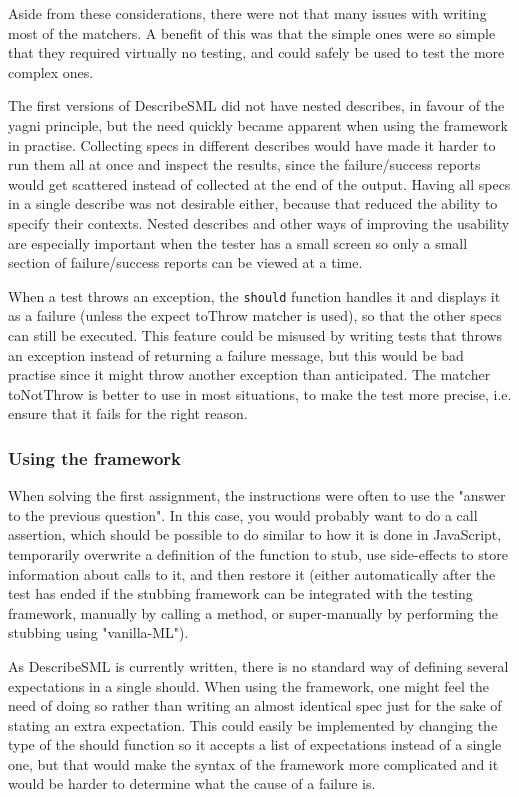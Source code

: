 \documentclass[11pt]{article}
\begin{document}
Aside from these considerations, there were not that many issues with writing most of the matchers. A benefit of this was that the simple ones were so simple that they required virtually no testing, and could safely be used to test the more complex ones.

The first versions of DescribeSML did not have nested describes, in favour of the \gls{yagni} principle, but the need quickly became apparent when using the framework in practise. Collecting specs in different describes would have made it harder to run them all at once and inspect the results, since the failure/success reports would get scattered instead of collected at the end of the output. Having all specs in a single describe was not desirable either, because that reduced the ability to specify their contexts. Nested describes and other ways of improving the usability are especially important when the tester has a small screen so only a small section of failure/success reports can be viewed at a time.

When a test throws an exception, the \texttt{should} function handles it and displays it as a failure (unless the expect toThrow matcher is used), so that the other specs can still be executed. This feature could be misused by writing tests that throws an exception instead of returning a failure message, but this would be bad practise since it might throw another exception than anticipated. The matcher toNotThrow is better to use in most situations, to make the test more precise, i.e. ensure that it fails for the right reason.

\subsubsection{Using the framework}

When solving the first assignment, the instructions were often to use the "answer to the previous question". In this case, you would probably want to do a call assertion, which should be possible to do similar to how it is done in JavaScript, temporarily overwrite a definition of the function to stub, use side-effects to store information about calls to it, and then restore it (either automatically after the test has ended if the stubbing framework can be integrated with the testing framework, manually by calling a method, or super-manually by performing the stubbing using "vanilla-ML").

As DescribeSML is currently written, there is no standard way of defining several expectations in a single should. When using the framework, one might feel the need of doing so rather than writing an almost identical spec just for the sake of stating an extra expectation. This could easily be implemented by changing the type of the should function so it accepts a list of expectations instead of a single one, but that would make the syntax of the framework more complicated and it would be harder to determine what the cause of a failure is.
\end{document}
